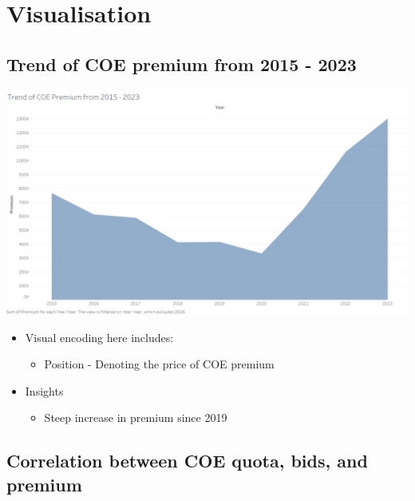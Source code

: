 \documentclass[a4paper, 11pt]{article}
\begin{document}
\section{Visualisation}
\label{sec:org0cff35f}
\subsection{Trend of COE premium from 2015 - 2023}
\label{sec:orge968de4}

\begin{center}
\includegraphics[width=.9\linewidth]{./charts/coe_premium.png}
\end{center}

\begin{itemize}
\item Visual encoding here includes:
\begin{itemize}
\item Position - Denoting the price of COE premium
\end{itemize}
\item Insights
\begin{itemize}
\item Steep increase in premium since 2019
\end{itemize}
\end{itemize}
\subsection{Correlation between COE quota, bids, and premium}
\label{sec:orgb0038a0}
\end{document}
